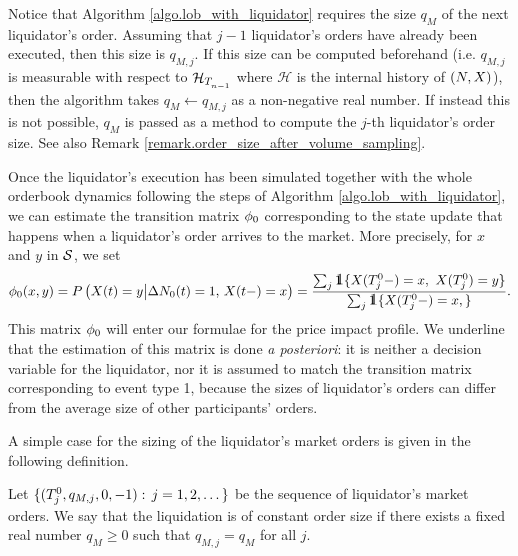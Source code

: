 \documentclass[10pt, article,table]{article}
\begin{document}
\begin{remark}
 Notice that Algorithm \ref{algo.lob_with_liquidator} requires the size $q_M$ of the next liquidator's order. Assuming that $j-1$ liquidator's orders have already been executed, then this size is $q_{M,j}$. If this size can be computed beforehand (i.e. $q_{M,j}$ is measurable with respect to $\mathcal{H}_{\arrivalTimes[]_{n-1}}$ where $\mathcal{H}$ is the internal history of $(\multiCountingProc,\stateVariable)$), then the algorithm takes  $q_M \leftarrow q_{M,j}$ as a non-negative real number. If instead this is not possible, $q_M$ is passed as a method to compute the $j$-th liquidator's order size. See also Remark \ref{remark.order_size_after_volume_sampling}. 
\end{remark}

Once the liquidator's execution has been simulated together with the whole orderbook dynamics following the steps of Algorithm \ref{algo.lob_with_liquidator}, we can estimate the transition matrix $\transProb_{0}$ corresponding to the  state update that happens when a liquidator's order arrives to the market. More precisely, for $x$ and $y$ in $\stateSpace$, we set 
\begin{equation}\label{eq.transProb_liquidator}
  \transProb_{0}(x,y) = \Prob\left(\stateVariable(t) = y \big\vert \Delta\countingProc[0](t)=1, \, \stateVariable(t-)=x\right) = \frac{\sum_j \one\lbrace\stateVariable(\arrivalTimes[0]_j - )=x, \, \, \stateVariable(\arrivalTimes[0]_j )=y\rbrace} {\sum_j \one\lbrace\stateVariable(\arrivalTimes[0]_j - )=x, \rbrace}.
\end{equation}
This matrix $\transProb_0$ will enter our formulae for the price impact profile. We underline that the estimation of this matrix is done \emph{a posteriori}: it is neither a decision variable for the liquidator, nor it is assumed to match the transition matrix corresponding to event type 1, because the sizes of liquidator's orders can differ from the average size of other participants' orders. 

A simple case for the sizing of the liquidator's market orders is given in the following definition. 
\begin{defi}\label{def.liquidation_with_constant_size}
 Let $\lbrace (\arrivalTimes[0]_j, q_{M,j}, 0, -1): \, j=1,2,\dots\rbrace$ be the sequence of liquidator's market orders. We say that the liquidation is of constant order size if there exists a fixed real number $q_{M}\geq 0$ such that $q_{M,j} = q_{M}$ for all $j$.
\end{defi}
\end{document}
